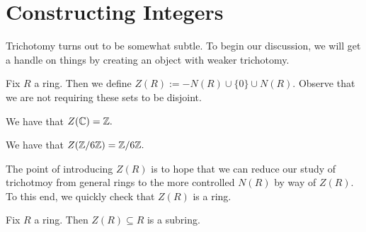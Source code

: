 \documentclass{article}
\begin{document}
\section{Constructing Integers}
Trichotomy turns out to be somewhat subtle. To begin our discussion, we will get a handle on things by creating an object with weaker trichotomy.
\begin{definition}[\texorpdfstring{$Z(R)$}{Z(R)}]
	Fix $R$ a ring. Then we define $Z(R):=-N(R)\cup\{0\}\cup N(R).$ Observe that we are not requiring these sets to be disjoint.
\end{definition}
\begin{example}
	We have that $Z(\mathbb C)=\mathbb Z.$
\end{example}
\begin{example}
	We have that $Z(\mathbb Z/6\mathbb Z)=\mathbb Z/6\mathbb Z.$
\end{example}
The point of introducing $Z(R)$ is to hope that we can reduce our study of trichotmoy from general rings to the more controlled $N(R)$ by way of $Z(R).$ To this end, we quickly check that $Z(R)$ is a ring.
\begin{proposition} \label{prop:zrisring}
	Fix $R$ a ring. Then $Z(R)\subseteq R$ is a subring.
\end{proposition}
\end{document}
